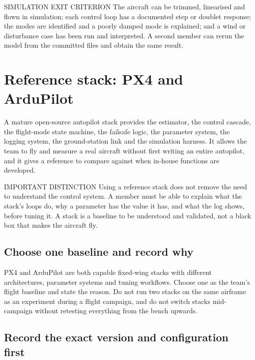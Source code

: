 \documentclass[11pt,a4paper]{article}
\begin{document}
\begin{callout}{SIMULATION EXIT CRITERION}
  The aircraft can be trimmed, linearised and flown in simulation; each control
  loop has a documented step or doublet response; the modes are identified and
  a poorly damped mode is explained; and a wind or disturbance case has been
  run and interpreted. A second member can rerun the model from the committed
  files and obtain the same result.
\end{callout}

\section{Reference stack: PX4 and ArduPilot}

A mature open-source autopilot stack provides the estimator, the control
cascade, the flight-mode state machine, the failsafe logic, the parameter
system, the logging system, the ground-station link and the simulation
harness. It allows the team to fly and measure a real aircraft without first
writing an entire autopilot, and it gives a reference to compare against when
in-house functions are developed.

\begin{callout}{IMPORTANT DISTINCTION}
  Using a reference stack does not remove the need to understand the control
  system. A member must be able to explain what the stack's loops do, why a
  parameter has the value it has, and what the log shows, before tuning it. A
  stack is a baseline to be understood and validated, not a black box that
  makes the aircraft fly.
\end{callout}

\subsection{Choose one baseline and record why}

PX4 and ArduPilot are both capable fixed-wing stacks with different
architectures, parameter systems and tuning workflows. Choose one as the
team's flight baseline and state the reason. Do not run two stacks on the same
airframe as an experiment during a flight campaign, and do not switch stacks
mid-campaign without retesting everything from the bench upwards.

\subsection{Record the exact version and configuration first}
\end{document}
